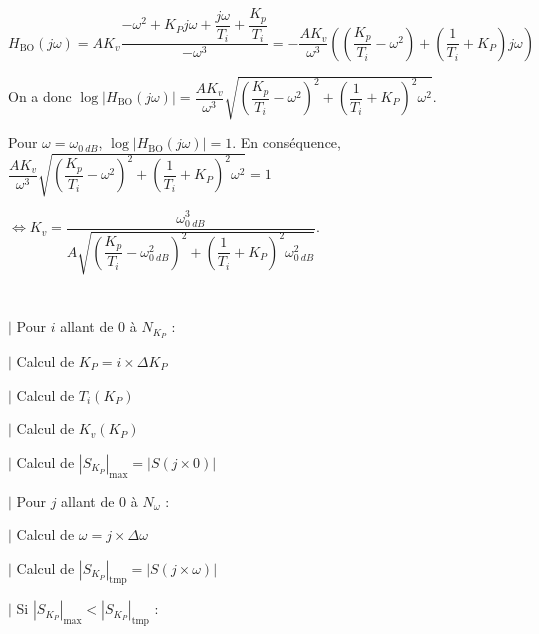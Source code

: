 \documentclass[10pt,fleqn]{article} %
\begin{document}
\subparagraph{} %

$H_{\text{BO}}(j\omega)=AK_v\dfrac{-\omega^2 + K_Pj\omega + \dfrac{j\omega}{T_i}+\dfrac{K_p}{T_i }}{-\omega^3}
=-\dfrac{AK_v}{\omega^3}  \left(\left(\dfrac{K_p}{T_i }-\omega^2 \right)+\left(\dfrac{1}{T_i}+ K_P\right)j\omega \right)$

On a donc 
$\log\left|H_{\text{BO}}(j\omega)\right|=\dfrac{AK_v}{\omega^3}  \sqrt{\left(\dfrac{K_p}{T_i }-\omega^2 \right)^2+\left(\dfrac{1}{T_i}+ K_P\right)^2\omega^2}$. 

Pour $\omega=\omega_{\SI{0}{dB}}$, $\log\left|H_{\text{BO}}(j\omega)\right|=1$. En conséquence, 
$\dfrac{AK_v}{\omega^3}  \sqrt{\left(\dfrac{K_p}{T_i }-\omega^2 \right)^2+\left(\dfrac{1}{T_i}+ K_P\right)^2\omega^2}=1 $

$\Leftrightarrow 
K_v  =\dfrac{\omega_{\SI{0}{dB}}^3}{A\sqrt{\left(\dfrac{K_p}{T_i }-\omega_{\SI{0}{dB}}^2 \right)^2+\left(\dfrac{1}{T_i}+ K_P\right)^2\omega_{\SI{0}{dB}}^2}}$.


\subparagraph{} %
~\\

\noindent \hspace{.4cm} $|$ Pour $i$ allant de 0 à $N_{K_P}$ :  

\noindent \hspace{.8cm} $|$ Calcul de $K_P=i\times \Delta K_P$ 

\noindent \hspace{.8cm} $|$ Calcul de $T_i \left( K_P\right)$ 

\noindent \hspace{.8cm} $|$ Calcul de $K_v\left( K_P\right)$ 

\noindent \hspace{.8cm} $|$ Calcul de $\left| S_{K_P} \right|_{\text{max}}=\left| S\left( j \times 0\right) \right|$

\noindent \hspace{.8cm} $|$ Pour $j$ allant de 0 à $N_{\omega}$ :  

\noindent \hspace{1.2cm} $|$ Calcul de $\omega=j\times \Delta \omega$ 

\noindent \hspace{1.2cm} $|$ Calcul de $\left| S_{K_P} \right|_{\text{tmp}}=\left| S\left( j \times \omega \right) \right|$

\noindent \hspace{1.2cm} $|$ Si $\left| S_{K_P} \right|_{\text{max}}< \left| S_{K_P} \right|_{\text{tmp}}$ :
\end{document}
